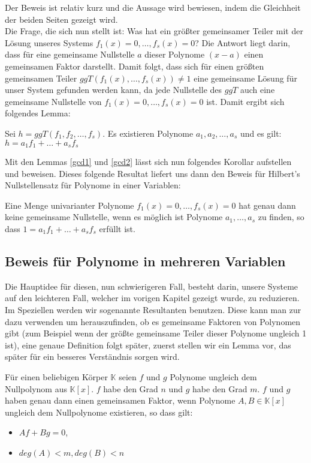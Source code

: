 \noindent Der Beweis ist relativ kurz und die Aussage wird bewiesen, indem die Gleichheit der beiden Seiten gezeigt wird.\\
\noindent Die Frage, die sich nun stellt ist: Was hat ein größter gemeinsamer Teiler mit der Lösung unseres Systems $f_1(x)=0,\ldots,f_s(x)=0$? Die Antwort liegt darin, dass für eine gemeinsame Nullstelle $a$ dieser Polynome $(x-a)$ einen gemeinsamen Faktor darstellt. Damit folgt, dass sich für einen größten gemeinsamen Teiler $ggT(f_1(x),\ldots,f_s(x)) \not = 1$ eine gemeinsame Lösung für unser System gefunden werden kann, da jede Nullstelle des $ggT$ auch eine gemeinsame Nullstelle von $f_1(x)=0,\ldots,f_s(x)=0$ ist. Damit ergibt sich folgendes Lemma:

\begin{lemma} \label{gcd2}
Sei $h = ggT(f_1,f_2,\ldots,f_s)$. Es existieren Polynome $a_1,a_2,\ldots,a_s$ und es gilt: $h = a_1f_1+ \ldots + a_sf_s$
\end{lemma}

\noindent Mit den Lemmas \ref{gcd1} und \ref{gcd2} lässt sich nun folgendes Korollar aufstellen und beweisen. Dieses folgende Resultat liefert uns dann den Beweis für Hilbert's Nullstellensatz für Polynome in einer Variablen:

\begin{corollary}
Eine Menge univarianter Polynome $f_1(x)=0,\ldots,f_s(x)=0$ hat genau dann keine gemeinsame Nullstelle, wenn es möglich ist Polynome $a_1,\ldots, a_s$ zu finden, so dass $1 = a_1f_1+ \ldots + a_sf_s$ erfüllt ist. \cite{Ausgangsartikel}
\end{corollary}

\subsection{Beweis für Polynome in mehreren Variablen}

Die Hauptidee für diesen, nun schwierigeren Fall, besteht darin, unsere Systeme auf den leichteren Fall, welcher im vorigen Kapitel gezeigt wurde, zu reduzieren. Im Speziellen werden wir sogenannte Resultanten benutzen. Diese kann man zur dazu verwenden um herauszufinden, ob es gemeinsame Faktoren von Polynomen gibt (zum Beispiel wenn der größte gemeinsame Teiler dieser Polynome ungleich 1 ist), eine genaue Definition folgt später, zuerst stellen wir ein Lemma vor, das später für ein besseres Verständnis sorgen wird.

\begin{lemma}
Für einen beliebigen Körper $\mathbb{K}$ seien $f$ und $g$ Polynome ungleich dem Nullpolynom aus $\mathbb{K}[x]$. $f$ habe den Grad $n$ und $g$ habe den Grad $m$. $f$ und $g$ haben genau dann einen gemeinsamen Faktor, wenn Polynome $A,B \in \mathbb{K}[x]$ ungleich dem Nullpolynome existieren, so dass gilt:
\begin{itemize}
\item $Af + Bg = 0$,
\item $deg(A) < m, deg(B) < n$
\end{itemize}
\end{lemma}

